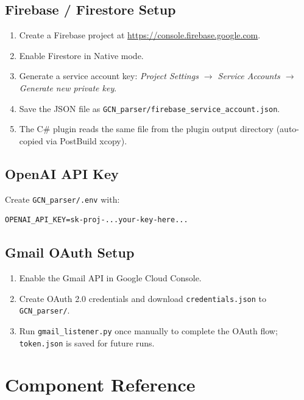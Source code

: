 \documentclass[12pt,a4paper]{article}
\begin{document}
\subsection{Firebase / Firestore Setup}

\begin{enumerate}
    \item Create a Firebase project at \url{https://console.firebase.google.com}.
    \item Enable Firestore in Native mode.
    \item Generate a service account key:
          \textit{Project Settings $\to$ Service Accounts $\to$
          Generate new private key}.
    \item Save the JSON file as
          \texttt{GCN\_parser/firebase\_service\_account.json}.
    \item The C\# plugin reads the same file from the plugin output
          directory (auto-copied via PostBuild xcopy).
\end{enumerate}

\subsection{OpenAI API Key}

Create \texttt{GCN\_parser/.env} with:

\begin{lstlisting}[style=bash]
OPENAI_API_KEY=sk-proj-...your-key-here...
\end{lstlisting}

\subsection{Gmail OAuth Setup}

\begin{enumerate}
    \item Enable the Gmail API in Google Cloud Console.
    \item Create OAuth 2.0 credentials and download
          \texttt{credentials.json} to \texttt{GCN\_parser/}.
    \item Run \texttt{gmail\_listener.py} once manually to complete the
          OAuth flow; \texttt{token.json} is saved for future runs.
\end{enumerate}

\section{Component Reference}
\end{document}
